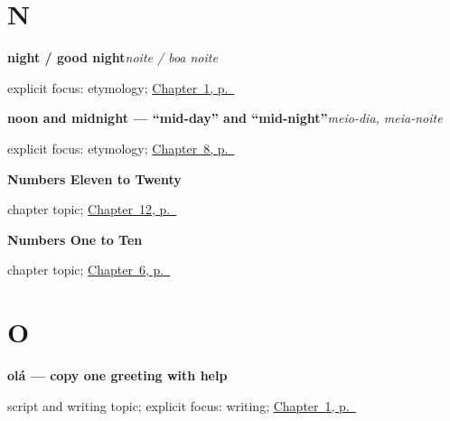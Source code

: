 \section*{N}

\noindent\begin{minipage}[t]{\linewidth}
\raggedright
\textbf{night / good night}\enspace\emph{noite / boa noite}\par
\footnotesize explicit focus: etymology; \hyperref[ch:greetings]{Chapter~1, p.~\pageref*{ch:greetings}}
\end{minipage}\par\smallskip

\noindent\begin{minipage}[t]{\linewidth}
\raggedright
\textbf{noon and midnight — \textquotedblleft{}mid-day\textquotedblright{} and \textquotedblleft{}mid-night\textquotedblright{}}\enspace\emph{meio-dia, meia-noite}\par
\footnotesize explicit focus: etymology; \hyperref[ch:pt-telling-time]{Chapter~8, p.~\pageref*{ch:pt-telling-time}}
\end{minipage}\par\smallskip

\noindent\begin{minipage}[t]{\linewidth}
\raggedright
\textbf{Numbers Eleven to Twenty}\par
\footnotesize chapter topic; \hyperref[ch:pt-numbers-eleven-to-twenty]{Chapter~12, p.~\pageref*{ch:pt-numbers-eleven-to-twenty}}
\end{minipage}\par\smallskip

\noindent\begin{minipage}[t]{\linewidth}
\raggedright
\textbf{Numbers One to Ten}\par
\footnotesize chapter topic; \hyperref[ch:pt-numbers-one-to-ten]{Chapter~6, p.~\pageref*{ch:pt-numbers-one-to-ten}}
\end{minipage}\par\smallskip

\section*{O}

\noindent\begin{minipage}[t]{\linewidth}
\raggedright
\textbf{olá — copy one greeting with help}\par
\footnotesize script and writing topic; explicit focus: writing; \hyperref[ch:greetings]{Chapter~1, p.~\pageref*{ch:greetings}}
\end{minipage}\par\smallskip

